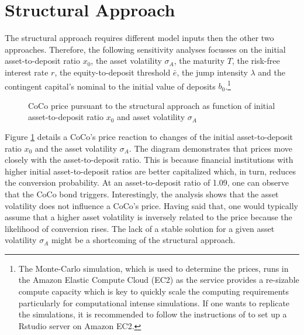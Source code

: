 \section{Structural Approach}\label{sensistructural}
The structural approach requires different model inputs then the other two approaches. Therefore, the following sensitivity analyses focusses on the initial asset-to-deposit ratio $x_0$, the asset volatility $\sigma_A$, the maturity $T$, the risk-free interest rate $r$, the equity-to-deposit threshold $\bar{e}$, the jump intensity $\lambda$ and the contingent capital's nominal to the initial value of deposits $b_0$.\footnote{The Monte-Carlo simulation, which is used to determine the prices, runs in the Amazon Elastic Compute Cloud (EC2) as the service provides a re-sizable compute capacity which is key to quickly scale the computing requirements particularly for computational intense simulations. If one wants to replicate the simulations, it is recommended to follow the instructions of \citet{amazonrstudio} to set up a Rstudio server on Amazon EC2.} 

\begin{figure}[H]
\centering
    \caption[CoCo price pursuant to the structural approach as function of asset-to-deposit ratio and asset volatility]{CoCo price pursuant to the structural approach as function of initial asset-to-deposit ratio $x_0$ and asset volatility $\sigma_A$}
  \label{fig:sa1}
  \end{figure}
  
Figure \ref{fig:sa1} details a CoCo's price reaction to changes of the initial asset-to-deposit ratio $x_0$ and the asset volatility $\sigma_A$. The diagram demonstrates that prices move closely with the asset-to-deposit ratio. This is because financial institutions with higher initial asset-to-deposit ratios are better capitalized which, in turn, reduces the conversion probability. At an asset-to-deposit ratio of 1.09, one can observe that the CoCo bond triggers. Interestingly, the analysis shows that the asset volatility does not influence a CoCo's price. Having said that, one would typically assume that a higher asset volatility is inversely related to the price because the likelihood of conversion rises. The lack of a stable solution for a given asset volatility $\sigma_A$ might be a shortcoming of the structural approach.

